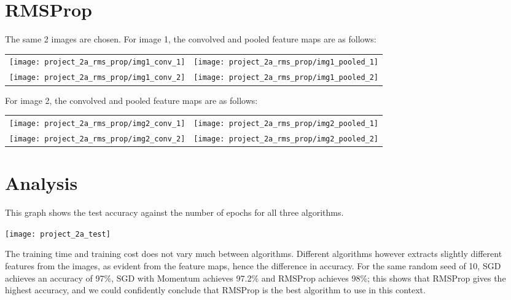 \section*{RMSProp}

The same 2 images are chosen.
For image 1, the convolved and pooled feature maps are as follows:

\begin{longtabu}{X[c]X[c]}
    \texttt{[image: project\_2a\_rms\_prop/img1\_conv\_1]} &
    \texttt{[image: project\_2a\_rms\_prop/img1\_pooled\_1]} \\
    \texttt{[image: project\_2a\_rms\_prop/img1\_conv\_2]} &
    \texttt{[image: project\_2a\_rms\_prop/img1\_pooled\_2]}
\end{longtabu}

For image 2, the convolved and pooled feature maps are as follows:

\begin{longtabu}{X[c]X[c]}
    \texttt{[image: project\_2a\_rms\_prop/img2\_conv\_1]} &
    \texttt{[image: project\_2a\_rms\_prop/img2\_pooled\_1]} \\
    \texttt{[image: project\_2a\_rms\_prop/img2\_conv\_2]} &
    \texttt{[image: project\_2a\_rms\_prop/img2\_pooled\_2]}
\end{longtabu}

\section*{Analysis}

This graph shows the test accuracy against the number of epochs for
all three algorithms.

\begin{center}
    \texttt{[image: project\_2a\_test]}
\end{center}

The training time and training cost does not vary much between algorithms.
Different algorithms however extracts slightly different features from the
images, as evident from the feature maps, hence the difference in accuracy.
For the same random seed of 10, SGD achieves an accuracy of 97\%, SGD with
Momentum achieves 97.2\% and RMSProp achieves 98\%; this shows that
RMSProp gives the highest accuracy, and we could confidently conclude that
RMSProp is the best algorithm to use in this context.
